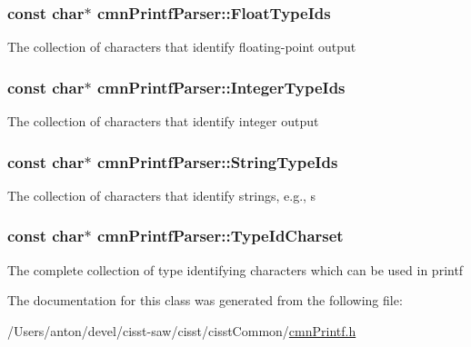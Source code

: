 \subsubsection[{Float\+Type\+Ids}]{\setlength{\rightskip}{0pt plus 5cm}const char$\ast$ cmn\+Printf\+Parser\+::\+Float\+Type\+Ids\hspace{0.3cm}{\ttfamily [static]}}\label{classcmn_printf_parser_ad7f764cf8f7fbb64a10f1a817b417015}
The collection of characters that identify floating-\/point output \hypertarget{classcmn_printf_parser_aa256066fc793a612014ac148e6f5c938}{}
\subsubsection[{Integer\+Type\+Ids}]{\setlength{\rightskip}{0pt plus 5cm}const char$\ast$ cmn\+Printf\+Parser\+::\+Integer\+Type\+Ids\hspace{0.3cm}{\ttfamily [static]}}\label{classcmn_printf_parser_aa256066fc793a612014ac148e6f5c938}
The collection of characters that identify integer output \hypertarget{classcmn_printf_parser_a44131161d46cb41973c04e59722332f1}{}
\subsubsection[{String\+Type\+Ids}]{\setlength{\rightskip}{0pt plus 5cm}const char$\ast$ cmn\+Printf\+Parser\+::\+String\+Type\+Ids\hspace{0.3cm}{\ttfamily [static]}}\label{classcmn_printf_parser_a44131161d46cb41973c04e59722332f1}
The collection of characters that identify strings, e.\+g., \textquotesingle{}s\textquotesingle{} \hypertarget{classcmn_printf_parser_aaa4ca685e67cabb8319f6c6e5b754517}{}
\subsubsection[{Type\+Id\+Charset}]{\setlength{\rightskip}{0pt plus 5cm}const char$\ast$ cmn\+Printf\+Parser\+::\+Type\+Id\+Charset\hspace{0.3cm}{\ttfamily [static]}}\label{classcmn_printf_parser_aaa4ca685e67cabb8319f6c6e5b754517}
The complete collection of type identifying characters which can be used in printf 

The documentation for this class was generated from the following file\+:\begin{DoxyCompactItemize}
\item 
/\+Users/anton/devel/cisst-\/saw/cisst/cisst\+Common/\hyperlink{cmn_printf_8h}{cmn\+Printf.\+h}\end{DoxyCompactItemize}
